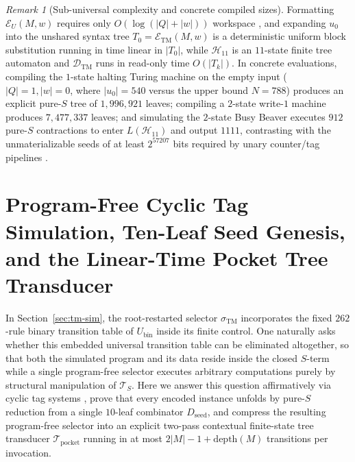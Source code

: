 \documentclass[11pt,reqno]{amsart}
\numberwithin{equation}{section}
\theoremstyle{plain}
\theoremstyle{definition}
\theoremstyle{remark}
\newtheorem{remark}[theorem]{Remark}
\newcommand{\TS}{\mathcal{T}_S}
\begin{document}
\begin{remark}[Sub-universal complexity and concrete compiled sizes]\label{rem:tm-complexity}
Formatting $\mathcal{E}_U(M,w)$ requires only $O(\log(|Q| + |w|))$ workspace \cite{NearyWoods2006SmallFast}, and expanding $u_0$ into the unshared syntax tree $T_0 = \mathcal{E}_{\mathrm{TM}}(M,w)$ is a deterministic uniform block substitution running in time linear in $|T_0|$, while $\mathcal{H}_{11}$ is an $11$-state finite tree automaton and $\mathcal{D}_{\mathrm{TM}}$ runs in read-only time $O(|T_k|)$. In concrete evaluations, compiling the $1$-state halting Turing machine on the empty input ($|Q|=1, |w|=0$, where $|u_0| = 540$ versus the upper bound $N = 788$) produces an explicit pure-$S$ tree of $1{,}996{,}921$ leaves; compiling a $2$-state write-$1$ machine produces $7{,}477{,}337$ leaves; and simulating the $2$-state Busy Beaver executes $912$ pure-$S$ contractions to enter $L(\mathcal{H}_{11})$ and output $1111$, contrasting with the unmaterializable seeds of at least $2^{57207}$ bits required by unary counter/tag pipelines \cite{Filin2026}.
\end{remark}


\section{Program-Free Cyclic Tag Simulation, Ten-Leaf Seed Genesis, and the Linear-Time Pocket Tree Transducer}\label{sec:cts-sim}

In Section~\ref{sec:tm-sim}, the root-restarted selector $\sigma_{\mathrm{TM}}$ incorporates the fixed $262$-rule binary transition table of $U_{\mathrm{bin}}$ inside its finite control. One naturally asks whether this embedded universal transition table can be eliminated altogether, so that both the simulated program and its data reside inside the closed $S$-term while a single program-free selector executes arbitrary computations purely by structural manipulation of $\TS$. Here we answer this question affirmatively via cyclic tag systems \cite{Cook2004Rule110}, prove that every encoded instance unfolds by pure-$S$ reduction from a single $10$-leaf combinator $D_{\mathrm{seed}}$, and compress the resulting program-free selector into an explicit two-pass contextual finite-state tree transducer $\mathcal{T}_{\mathrm{pocket}}$ running in at most $2|M| - 1 + \mathrm{depth}(M)$ transitions per invocation.
\end{document}

